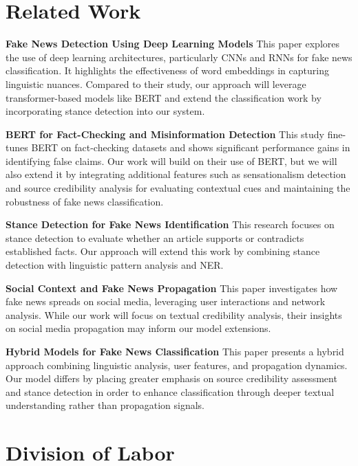 \documentclass[11pt,a4paper]{article}
\begin{document}
\section{Related Work}

\textbf{Fake News Detection Using Deep Learning Models} \cite{hu2022deep}
This paper explores the use of deep learning architectures, particularly CNNs and RNNs for fake news classification. It highlights the effectiveness of word embeddings in capturing linguistic nuances. 
Compared to their study, our approach will leverage transformer-based models like BERT and extend the classification work by incorporating stance detection into our system.

\textbf{BERT for Fact-Checking and Misinformation Detection} \cite{anggrainingsih2025evaluating}
This study fine-tunes BERT on fact-checking datasets and shows significant performance gains in identifying false claims. 
Our work will build on their use of BERT, but we will also extend it by integrating additional features such as sensationalism detection and source credibility analysis for evaluating contextual cues and maintaining the robustness of fake news classification.

\textbf{Stance Detection for Fake News Identification} \cite{li2022brief}
This research focuses on stance detection to evaluate whether an article supports or contradicts established facts. 
Our approach will extend this work by combining stance detection with linguistic pattern analysis and NER.

\textbf{Social Context and Fake News Propagation} \cite{chen2025enhancing}
This paper investigates how fake news spreads on social media, leveraging user interactions and network analysis. 
While our work will focus on textual credibility analysis, their insights on social media propagation may inform our model extensions.

\textbf{Hybrid Models for Fake News Classification} \cite{mostafa2024modality}
This paper presents a hybrid approach combining linguistic analysis, user features, and propagation dynamics. 
Our model differs by placing greater emphasis on source credibility assessment and stance detection in order to enhance classification through deeper textual understanding rather than propagation signals.

\section{Division of Labor}
\end{document}
